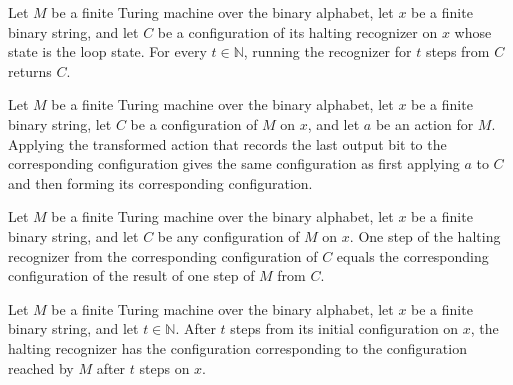 \begin{lemma}
\label{Complexity.acceptTM_loop}
\leanok
{}
Let $M$ be a finite Turing machine over the binary alphabet, let $x$ be a finite binary
string, and let $C$ be a configuration of its halting recognizer on $x$ whose state is
the loop state. For every $t\in\mathbb{N}$, running the recognizer for $t$ steps from
$C$ returns $C$.
\end{lemma}

\begin{lemma}
\label{Complexity.acceptCfg_apply}
\leanok
{}
Let $M$ be a finite Turing machine over the binary alphabet, let $x$ be a finite binary
string, let $C$ be a configuration of $M$ on $x$, and let $a$ be an action for $M$.
Applying the transformed action that records the last output bit to the corresponding
configuration gives the same configuration as first applying $a$ to $C$ and then forming
its corresponding configuration.
\end{lemma}

\begin{lemma}
\label{Complexity.acceptCfg_step}
\leanok
{}
Let $M$ be a finite Turing machine over the binary alphabet, let $x$ be a finite binary
string, and let $C$ be any configuration of $M$ on $x$. One step of the halting
recognizer from the corresponding configuration of $C$ equals the corresponding
configuration of the result of one step of $M$ from $C$.
\end{lemma}

\begin{lemma}
\label{Complexity.acceptTM_run}
\leanok
{}
Let $M$ be a finite Turing machine over the binary alphabet, let $x$ be a finite binary
string, and let $t\in\mathbb{N}$. After $t$ steps from its initial configuration on $x$,
the halting recognizer has the configuration corresponding to the configuration reached
by $M$ after $t$ steps on $x$.
\end{lemma}

